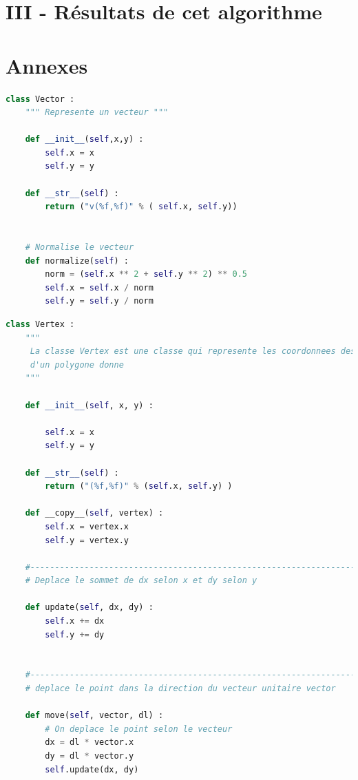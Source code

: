 \documentclass[a4paper,reqno]{article}
\newcommand{\pa}{\hspace{0.5cm}}
\begin{document}
\newpage
\section*{III - Résultats de cet algorithme }

\newpage

\pa 






\section*{Annexes}



\begin{lstlisting}[language=Python,frame=single,caption=Création de la classe Vecteur]
class Vector : 
    """ Represente un vecteur """
    
    def __init__(self,x,y) : 
        self.x = x 
        self.y = y 
        
    def __str__(self) : 
        return ("v(%f,%f)" % ( self.x, self.y))
        
        
    # Normalise le vecteur 
    def normalize(self) : 
        norm = (self.x ** 2 + self.y ** 2) ** 0.5
        self.x = self.x / norm 
        self.y = self.y / norm 
\end{lstlisting}


\begin{lstlisting}[language=Python,frame=single,caption=Création d'une classe Vertex]
class Vertex : 
    """
     La classe Vertex est une classe qui represente les coordonnees des points 
     d'un polygone donne 
    """
    
    def __init__(self, x, y) : 
        
        self.x = x 
        self.y = y 
    
    def __str__(self) : 
        return ("(%f,%f)" % (self.x, self.y) )
    
    def __copy__(self, vertex) : 
        self.x = vertex.x 
        self.y = vertex.y 
    
    #---------------------------------------------------------------------    
    # Deplace le sommet de dx selon x et dy selon y 
    
    def update(self, dx, dy) : 
        self.x += dx 
        self.y += dy 
        
        
    #---------------------------------------------------------------------   
    # deplace le point dans la direction du vecteur unitaire vector 
    
    def move(self, vector, dl) : 
        # On deplace le point selon le vecteur
        dx = dl * vector.x 
        dy = dl * vector.y 
        self.update(dx, dy) 
\end{lstlisting}
\end{document}
